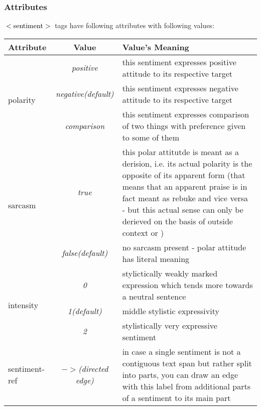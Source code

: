 \documentclass[11pt,a4paper]{article}
\newcommand{\xmltag}[1]{\textcolor{black}{{\small$<$#1$>$}}}
\begin{document}
\subsubsection{Attributes}
\xmltag{sentiment} tags have following attributes with following
values:

\begin{tabular}{|l|c|p{}|}\hline
  Attribute & Value & Value's Meaning\\\hline

  \multirow{3}{*}{polarity} & \textit{positive} & this sentiment
  expresses positive attitude to its respective target\\\cline{2-3}

  & \textit{negative\newline(default)} & this sentiment
  expresses negative attitude to its respective target\\\cline{2-3}

  & \textit{comparison} & this sentiment expresses comparison of two
  things with preference given to some of them\\\hline

  \multirow{2}{*}{sarcasm} & \textit{true} & this polar attitutde is
  meant as a derision, i.e. its actual polarity is the opposite of its
  apparent form (that means that an apparent praise is in fact meant
  as rebuke and vice versa - but this actual sense can only be
  derieved on the basis of outside context or )\\\cline{2-3}

  & \textit{false\newline(default)} & no sarcasm present - polar
  attitude has literal meaning\\\hline

  \multirow{3}{*}{intensity} & \textit{0} & stylictically weakly
  marked expression which tends more towards a neutral
  sentence\\\cline{2-3}

  & \textit{1\newline(default)} & middle stylistic
  expressivity\\\cline{2-3}

  & \textit{2} & stylistically very expressive sentiment\\\hline

  sentiment-ref & \textit{$->$\newline(directed edge)} & in case a
  single sentiment is not a contiguous text span but rather split into
  parts, you can draw an edge with this label from additional parts of
  a sentiment to its main part\\\hline
\end{tabular}
\end{document}

